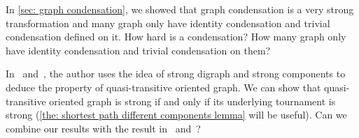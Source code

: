 In \cref{sec: graph condensation},
we showed that graph condensation is a very strong transformation
and many graph only have identity condensation
and trivial condensation defined on it.
How hard is a condensation?
How many graph only have identity condensation
and trivial condensation on them?

In~\cite{bang-jensen_kings_1998}
and~\cite{bangjensen_quasitransitive_1995},
the author uses the idea of strong digraph and strong components
to deduce the property of quasi-transitive oriented graph.
We can show that quasi-transitive oriented graph is strong
if and only if its underlying tournament is strong
(\cref{the: shortest path different components lemma} will be useful).
Can we combine our results with the result
in~\cite{bang-jensen_kings_1998} and~\cite{bangjensen_quasitransitive_1995}?

